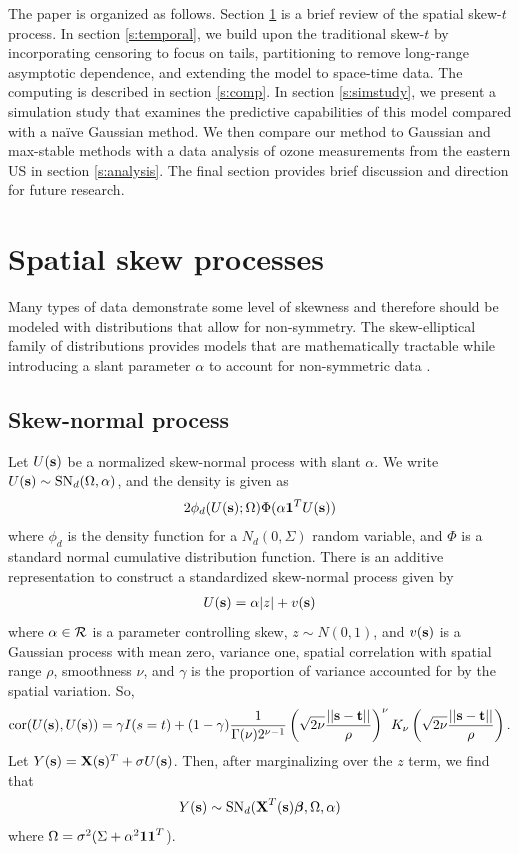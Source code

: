 \documentclass[11pt]{article}
\begin{document}
The paper is organized as follows.
Section \ref{s:skewt} is a brief review of the spatial skew-$t$ process.
In section \ref{s:temporal}, we build upon the traditional skew-$t$ by incorporating censoring to focus on tails, partitioning to remove long-range asymptotic dependence, and extending the model to space-time data.
The computing is described in section \ref{s:comp}.
In section \ref{s:simstudy}, we present a simulation study that examines the predictive capabilities of this model compared with a na{\"i}ve Gaussian method.
We then compare our method to Gaussian and max-stable methods with a data analysis of ozone measurements from the eastern US in section \ref{s:analysis}.
The final section provides brief discussion and direction for future research.

\section{Spatial skew processes}\label{s:skewt}
Many types of data demonstrate some level of skewness and therefore should be modeled with distributions that allow for non-symmetry.
The skew-elliptical family of distributions provides models that are mathematically tractable while introducing a slant parameter $\alpha$ to account for non-symmetric data \citep{Genton2004}.

\subsection{Skew-normal process}
Let $U(\mbox{\bf s})$ be a normalized skew-normal process with slant $\alpha$. We write $U(\mbox{\bf s}) \sim \text{SN}_d(\Omega, \alpha)$, and the density is given as
\begin{align}
  2 \phi_d (U(\mbox{\bf s}); \Omega) \Phi(\alpha \mbox{\boldmath $1$}^T U(\mbox{\bf s}))
\end{align}
where $\phi_d$ is the density function for a $N_d(0, \Sigma)$ random variable, and $\Phi$ is a standard normal cumulative distribution function.
There is an additive representation \citep{Zhang2010} to construct a standardized skew-normal process given by
\begin{align}
  U(\mbox{\bf s}) = \alpha |z| + v(\mbox{\bf s})
\end{align}
where $\alpha \in {\cal R}$ is a parameter controlling skew, $z \sim N(0, 1)$, and $v(\mbox{\bf s})$ is a Gaussian process with mean zero, variance one, \Matern spatial correlation with spatial range $\rho$, smoothness $\nu$, and $\gamma$ is the proportion of variance accounted for by the spatial variation.
So,
\begin{align}
  \text{cor}(U(\mbox{\bf s}), U(\mbox{\bf s})) = \gamma I(s = t) + (1 - \gamma)  \frac{ 1 }{ \Gamma(\nu) 2^{ \nu - 1}} \left( \sqrt{2\nu} \frac{ ||\mbox{\bf s} - \mbox{\bf t}|| }{ \rho } \right)^{\nu} K_{\nu} \left( \sqrt{2\nu} \frac{ ||\mbox{\bf s} - \mbox{\bf t}|| }{ \rho } \right).
\end{align}
Let $Y(\mbox{\bf s}) = \mbox{\bf X}(\mbox{\bf s})^T + \sigma U(\mbox{\bf s})$.
Then, after marginalizing over the $z$ term, we find that
\begin{align}
  Y(\mbox{\bf s}) \sim \text{SN}_d(\mbox{\bf X}^T(\mbox{\bf s})\mbox{\boldmath $\beta$}, \Omega, \alpha)
\end{align}
where $\Omega = \sigma^2 (\Sigma + \alpha^2 \mbox{\boldmath $1$} \mbox{\boldmath $1$}^T$).
\end{document}
